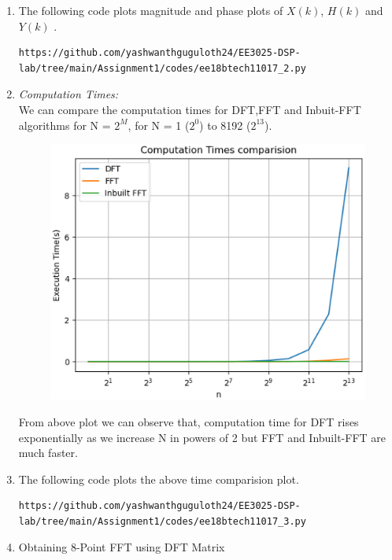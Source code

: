 \documentclass[journal,12pt,twocolumn]{IEEEtran}
\renewcommand\thesection{\arabic{section}}
\begin{document}
\begin{enumerate}[label=\thesection.\arabic*.,ref=\thesection.\theenumi]
\item The following code plots magnitude and phase plots of $X(k)$, $H(k)$ and $Y(k)$ .
\begin{lstlisting}
https://github.com/yashwanthguguloth24/EE3025-DSP-lab/tree/main/Assignment1/codes/ee18btech11017_2.py
\end{lstlisting}


\item \emph{Computation Times:} \\
We can compare the computation times for DFT,FFT and Inbuit-FFT algorithms for N = $2^{M}$, for N = 1 ($2^{0}$) to 8192 ($2^{13}$).

\begin{figure}[!ht]
	\includegraphics[width=1.15\columnwidth]{./figs/ee18btech11017_fig4.eps}
\end{figure}

From above plot we can observe that, computation time for DFT rises exponentially as we increase N in powers of 2 but FFT and Inbuilt-FFT are much faster.

\item The following code plots the above time comparision plot.
\begin{lstlisting}
https://github.com/yashwanthguguloth24/EE3025-DSP-lab/tree/main/Assignment1/codes/ee18btech11017_3.py
\end{lstlisting}


\item Obtaining 8-Point FFT using DFT Matrix



\end{enumerate}
\end{document}
